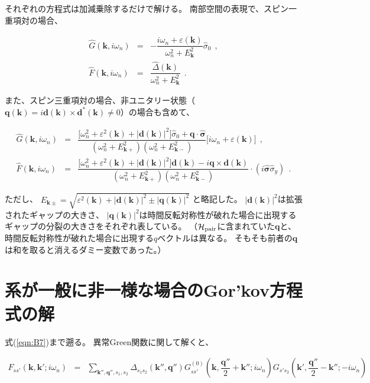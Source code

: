\documentclass[uplatex,a4j,12pt,dvipdfmx]{jsarticle}
\begin{document}
それぞれの方程式は加減乗除するだけで解ける。
南部空間の表現で、スピン一重項対の場合、

\begin{eqnarray}
	\hat{G}(\bm{k},i \omega_{n})
	&=&
	- \dfrac{ i \omega_{n} + \varepsilon(\bm{k}) }{ \omega_{n}^{2} + E_{\bm{k}}^{2} }
	\hat{\sigma}_{0}
	\ \ ,
	\nonumber \\[2mm]
	\hat{F}(\bm{k},i \omega_{n})
	&=&
	\dfrac{ \hat{\Delta}(\bm{k}) }{ \omega_{n}^{2} + E_{\bm{k}}^{2} }
	\ \ .
\end{eqnarray}

また、スピン三重項対の場合、非ユニタリー状態（$\bm{q}(\bm{k}) = i \bm{d}(\bm{k}) \times \bm{d}^{*}(\bm{k}) \neq 0$）の場合も含めて、

\begin{eqnarray}
	\hat{G}(\bm{k},i \omega_{n})
	&=&
	\dfrac{ \Big[ \omega_{n}^{2} + \varepsilon^{2}(\bm{k}) + | \bm{d}(\bm{k}) |^{2} \Big] \hat{\sigma}_{0} + \bm{q} \cdot \hat{\bm{\sigma}} }
	{ ( \omega_{n}^{2} + E_{\bm{k}+}^{2} ) ( \omega_{n}^{2} + E_{\bm{k}-}^{2} ) }
	\Big[ i \omega_{n} + \varepsilon(\bm{k}) \Big]
	\ \ ,
	\nonumber \\[2mm]
	\hat{F}(\bm{k},i \omega_{n})
	&=&
	\dfrac{ \Big[ \omega_{n}^{2} + \varepsilon^{2}(\bm{k}) + | \bm{d}(\bm{k}) |^{2} \Big] \bm{d}(\bm{k}) - i \bm{q} \times \bm{d}(\bm{k}) }
	{ ( \omega_{n}^{2} + E_{\bm{k}+}^{2} ) ( \omega_{n}^{2} + E_{\bm{k}-}^{2} ) }
	\cdot
	(i \hat{\bm{\sigma}} \hat{\sigma}_{y})
	\ \ .
\end{eqnarray}

ただし、
$E_{\bm{k} \pm} = \sqrt{ \varepsilon^{2}(\bm{k}) + | \bm{d}(\bm{k}) |^{2} \pm | \bm{q}(\bm{k}) |^{2} }$
と略記した。
$|\bm{d}(\bm{k})|^{2}$は拡張されたギャップの大きさ、
$|\bm{q}(\bm{k})|^{2}$は時間反転対称性が破れた場合に出現するギャップの分裂の大きさをそれぞれ表している。
（$\mathcal{H}_{\rm pair}$に含まれていた$\bm{q}$と、時間反転対称性が破れた場合に出現する$q$ベクトルは異なる。
そもそも前者の$\bm{q}$は和を取ると消えるダミー変数であった。）
\section{系が一般に非一様な場合のGor'kov方程式の解}

式(\ref{eqn:B7})まで遡る。
異常Green関数に関して解くと、

\begin{eqnarray}
	F_{ss'} ( \bm{k} , \bm{k}' ; i \omega_{n} )
	&=&
	\sum_{\bm{k}'' , \bm{q}'' , s_{1} , s_{2}}
	\Delta_{s_{1} s_{2}}( \bm{k}'' , \bm{q}'' )
	G_{ss'}^{(0)} ( \bm{k} , \dfrac{\bm{q}''}{2} + \bm{k}'' ; i \omega_{n} )
	G_{s' s_{2}} ( \bm{k}' , \dfrac{\bm{q}''}{2} - \bm{k}'' ; - i \omega_{n} )
\end{eqnarray}
\end{document}
